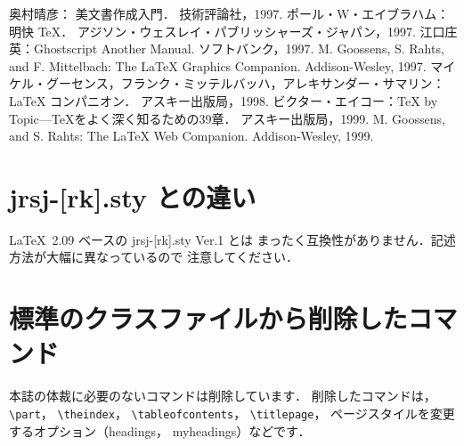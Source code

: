 \documentclass[paper]{jrsj}    %
\begin{document}
\begin{thebibliography}{99}
 奥村晴彦：\LaTeXe{} 美文書作成入門．
 技術評論社，1997.
 ポール・W・エイブラハム：明快 \TeX{}．
 アジソン・ウェスレイ・パブリッシャーズ・ジャパン，1997.
 江口庄英：Ghostscript Another Manual. 
 ソフトバンク，1997.
 M. Goossens, S. Rahts, and  F. Mittelbach: 
 The \LaTeX{} Graphics Companion. Addison-Wesley, 1997.
 マイケル・グーセンス，フランク・ミッテルバッハ，アレキサンダー・サマリン：
 \LaTeX{} コンパニオン．
 アスキー出版局，1998.
 ビクター・エイコー：\TeX{} by Topic---\TeX{}をよく深く知るための39章．
 アスキー出版局，1999.
 M. Goossens, and S. Rahts: 
 The \LaTeX{} Web Companion. 
 Addison-Wesley, 1999.
\end{thebibliography}

\appendix
\section{{\ttfamily jrsj-[rk].sty} との違い}
\label{sec:app}

\LaTeX~2.09 ベースの {\ttfamily jrsj-[rk].sty Ver.1} とは
まったく互換性がありません．記述方法が大幅に異なっているので
注意してください．

\section{標準のクラスファイルから削除したコマンド}

本誌の体裁に必要のないコマンドは削除しています．
削除したコマンドは，\verb/\part/，\allowbreak
\verb/\theindex/，\allowbreak
\verb/\tableofcontents/，\allowbreak
\verb/\titlepage/，\allowbreak
ページスタイルを変更するオプション（{\ttfamily headings}，
{\ttfamily myheadings}）などです．


\begin{biography}
\end{biography}
\end{document}
